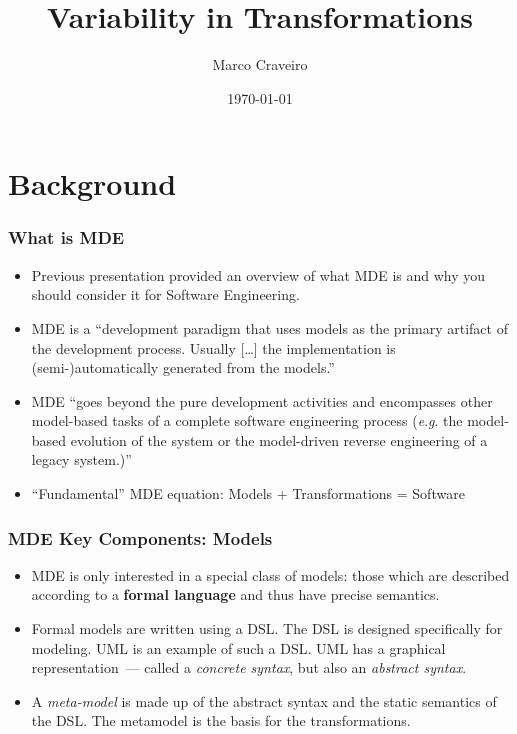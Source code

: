 \documentclass{beamer}
\title{Variability in Transformations}
\author{Marco Craveiro}
\date{\today}
\newcommand{\eg}{\textit{e}.\textit{g}. }
\begin{document}

\section{Background}

\begin{frame}
\frametitle{What is \ac{MDE}}

\begin{itemize}
\item Previous presentation provided an overview of what \ac{MDE} is
  and why you should consider it for Software Engineering.

\pause

\item \ac{MDE} is a ``development paradigm that uses models as the
  primary artifact of the development process. Usually [\ldots] the
  implementation is (semi-)automatically generated from the
  models.''\cite{brambilla2012model}

\pause

\item \ac{MDE} ``goes beyond the pure development activities and
  encompasses other model-based tasks of a complete software
  engineering process (\eg the model-based evolution of the system or
  the model-driven reverse engineering of a legacy
  system.)''\cite{brambilla2012model}

\pause

\item ``Fundamental'' \ac{MDE} equation: Models + Transformations =
  Software

\end{itemize}

\end{frame}

\begin{frame}
\frametitle{\ac{MDE} Key Components: Models}

\begin{itemize}

\item \ac{MDE} is only interested in a special class of models: those
  which are described according to a \textbf{formal language} and thus
  have precise semantics.

\pause

\item Formal models are written using a \acf{DSL}. The \ac{DSL} is
  designed specifically for modeling. \acf{UML} is an example of such
  a \ac{DSL}. \ac{UML} has a graphical representation~--- called a
  \emph{concrete syntax}, but also an \emph{abstract syntax}.

\pause

\item A \emph{meta-model} is made up of the abstract syntax and the
  static semantics of the \ac{DSL}. The metamodel is the basis for the
  transformations.

\end{itemize}

\end{frame}
\end{document}
